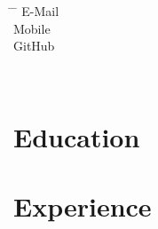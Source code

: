 \documentclass[12pt]{report} %
\begin{document}






\begin{minipage}{0.45\textwidth}
\begin{tabbing}
\hspace{3cm} \= \hspace{4cm} \= \kill %
E-Mail  \> \href{mailto:\varEmail}{\varEmail} \\
Mobile  \> \varMobile \\
\DoIfNotEmpty{\varGithub}
{GitHub \> \href{\varGithub}{\varGithub} \\}%
\end{tabbing}
\end{minipage}%
\hfill
\begin{minipage}{0.3\textwidth}%
\varAddress \\%
\end{minipage}%



\section{Education}

\education{}
\begin{list}{}%
         {\setlength{\leftmargin}{0.19\linewidth}}%
         \item[]%
{\small{\color{gray}\varEducationInfo{}}}
\end{list}



\section{Experience}

\professional{}
\end{document}
